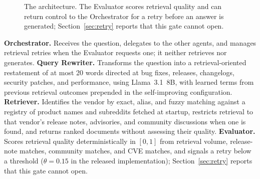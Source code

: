\documentclass[10pt,conference]{IEEEtran}
\begin{document}
\begin{figure}[t]
\centering
{}
\caption{The architecture. The Evaluator scores retrieval quality and can return
control to the Orchestrator for a retry before an answer is generated;
Section~\ref{sec:retry} reports that this gate cannot open.}
\label{fig:architecture}
\end{figure}

\textbf{Orchestrator.} Receives the question, delegates to the other agents, and
manages retrieval retries when the Evaluator requests one; it neither retrieves
nor generates. \textbf{Query Rewriter.} Transforms the question into a
retrieval-oriented restatement of at most 20 words directed at bug fixes,
releases, changelogs, security patches, and performance, using Llama~3.1~8B, with
learned terms from previous retrieval outcomes prepended in the self-improving
configuration. \textbf{Retriever.} Identifies the vendor by exact, alias, and
fuzzy matching against a registry of product names and subreddits fetched at
startup, restricts retrieval to that vendor's release notes, advisories, and
community discussions when one is found, and returns ranked documents without
assessing their quality. \textbf{Evaluator.} Scores retrieval quality
deterministically in $[0,1]$ from retrieval volume, release-note matches,
community matches, and CVE matches, and signals a retry below a threshold
($\theta=0.15$ in the released implementation); Section~\ref{sec:retry} reports
that this gate cannot open.
\end{document}
